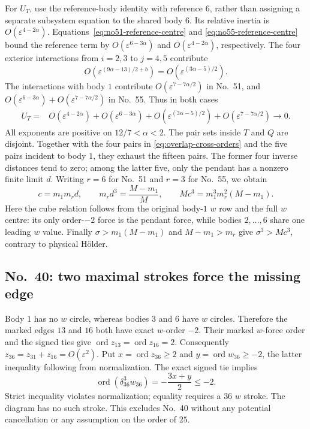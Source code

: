 \documentclass[11pt]{amsart}
\theoremstyle{remark}
\newcommand{\ord}{\operatorname{ord}}
\begin{document}
For $U_T$, use the reference-body identity with reference $6$, rather than assigning a separate subsystem equation to the shared body $6$. Its relative inertia is $O(\varepsilon^{4-2\alpha})$.
Equations~\eqref{eq:no51-reference-centre} and
\eqref{eq:no55-reference-centre} bound the reference term by
$O(\varepsilon^{6-3\alpha})$ and
$O(\varepsilon^{4-2\alpha})$, respectively.
The four exterior interactions from $i=2,3$ to $j=4,5$ contribute
\[
 O\!\left(\varepsilon^{(9\alpha-13)/2+b}\right)
 =O\!\left(\varepsilon^{(3\alpha-5)/2}\right).
\]
The interactions with body $1$ contribute
$O(\varepsilon^{7-7\alpha/2})$ in No.~51, and
$O(\varepsilon^{6-3\alpha})+O(\varepsilon^{7-7\alpha/2})$ in No.~55.
Thus in both cases
\begin{equation}\label{eq:overlap-outer-potential}
\begin{aligned}
 U_T={}&O(\varepsilon^{4-2\alpha})
 +O(\varepsilon^{6-3\alpha})
 +O(\varepsilon^{(3\alpha-5)/2})
 +O(\varepsilon^{7-7\alpha/2})\longrightarrow0.
\end{aligned}
\end{equation}
All exponents are positive on $12/7<\alpha<2$.
The pair sets inside $T$ and $Q$ are disjoint. Together with the four pairs in
\eqref{eq:overlap-cross-orders} and the five pairs incident to body $1$, they exhaust the fifteen pairs. The former four inverse distances tend to zero; among the latter five, only the pendant has a nonzero finite limit $d$.
Writing $r=6$ for No.~51 and $r=3$ for No.~55, we obtain
\[
 c=m_1m_r d,\qquad m_rd^3=\frac{M-m_1}{M},\qquad
 Mc^3=m_1^3m_r^2(M-m_1).
\]
Here the cube relation follows from the original body-$1$ $w$ row and the full $w$ centre: its only order-$-2$ force is the pendant force, while bodies $2,\ldots,6$ share one leading $w$ value. Finally
$\sigma>m_1(M-m_1)$ and $M-m_1>m_r$ give
$\sigma^3>Mc^3$, contrary to physical H\"older.

\subsection{No.~40: two maximal strokes force the missing edge}
\label{sec:no40-pole}
Body $1$ has no $w$ circle, whereas bodies $3$ and $6$ have $w$ circles. Therefore the marked edges $13$ and $16$ both have exact $w$-order $-2$.
Their marked $w$-force order and the signed ties give
$\ord z_{13}=\ord z_{16}=2$.
Consequently $z_{36}=z_{31}+z_{16}=O(\varepsilon^2)$.
Put $x=\ord z_{36}\ge2$ and $y=\ord w_{36}\ge-2$, the latter inequality following from normalization. The exact signed tie implies
\[
 \ord(\delta_{36}^3w_{36})=-\frac{3x+y}{2}\le-2.
\]
Strict inequality violates normalization; equality requires a $36$ $w$ stroke. The diagram has no such stroke. This excludes No.~40 without any potential cancellation or any assumption on the order of $25$.
\end{document}
